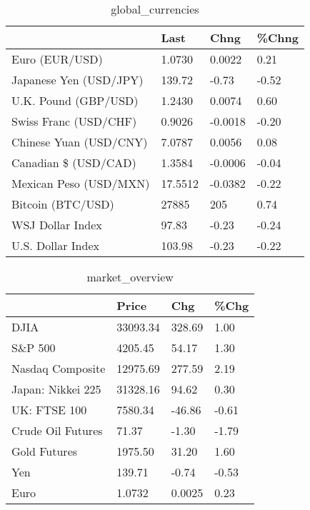 \documentclass{article}%
\begin{document}
%


\begin{table}[htbp]%
\caption{global\_currencies}%
\centering%
\begin{adjustbox}{width=1\textwidth}%
\begin{tabular}{llll}
\toprule
                       &    Last &    Chng & \%Chng \\
\midrule
        Euro (EUR/USD) &  1.0730 &  0.0022 &  0.21 \\
Japanese Yen (USD/JPY) &  139.72 &   -0.73 & -0.52 \\
  U.K. Pound (GBP/USD) &  1.2430 &  0.0074 &  0.60 \\
 Swiss Franc (USD/CHF) &  0.9026 & -0.0018 & -0.20 \\
Chinese Yuan (USD/CNY) &  7.0787 &  0.0056 &  0.08 \\
  Canadian \$ (USD/CAD) &  1.3584 & -0.0006 & -0.04 \\
Mexican Peso (USD/MXN) & 17.5512 & -0.0382 & -0.22 \\
     Bitcoin (BTC/USD) &   27885 &     205 &  0.74 \\
      WSJ Dollar Index &   97.83 &   -0.23 & -0.24 \\
     U.S. Dollar Index &  103.98 &   -0.23 & -0.22 \\
\bottomrule
\end{tabular}
%
\end{adjustbox}%
\end{table}

%


\begin{table}[htbp]%
\caption{market\_overview}%
\centering%
\begin{adjustbox}{width=1\textwidth}%
\begin{tabular}{llll}
\toprule
                  &    Price &    Chg &  \%Chg \\
\midrule
             DJIA & 33093.34 & 328.69 &  1.00 \\
          S\&P 500 &  4205.45 &  54.17 &  1.30 \\
 Nasdaq Composite & 12975.69 & 277.59 &  2.19 \\
Japan: Nikkei 225 & 31328.16 &  94.62 &  0.30 \\
     UK: FTSE 100 &  7580.34 & -46.86 & -0.61 \\
Crude Oil Futures &    71.37 &  -1.30 & -1.79 \\
     Gold Futures &  1975.50 &  31.20 &  1.60 \\
              Yen &   139.71 &  -0.74 & -0.53 \\
             Euro &   1.0732 & 0.0025 &  0.23 \\
\bottomrule
\end{tabular}
%
\end{adjustbox}%
\end{table}

%
\end{document}
